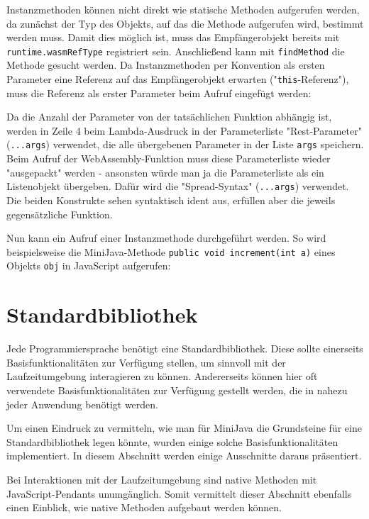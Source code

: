 Instanzmethoden können nicht direkt wie statische Methoden aufgerufen werden, da zunächst der Typ des Objekts, auf das die Methode aufgerufen wird, bestimmt werden muss. Damit dies möglich ist, muss das Empfängerobjekt bereits mit \lstinline{runtime.wasmRefType} registriert sein. Anschließend kann mit \lstinline{findMethod} die Methode gesucht werden. Da Instanzmethoden per Konvention als ersten Parameter eine Referenz auf das Empfängerobjekt erwarten ("\lstinline{this}-Referenz"), muss die Referenz als erster Parameter beim Aufruf eingefügt werden:



Da die Anzahl der Parameter von der tatsächlichen Funktion abhängig ist, werden in Zeile 4 beim Lambda-Ausdruck in der Parameterliste "Rest-Parameter" (\lstinline{...args}) \cite{MDNJavaScript} verwendet, die alle übergebenen Parameter in der Liste \lstinline{args} speichern. Beim Aufruf der WebAssembly-Funktion muss diese Parameterliste wieder "ausgepackt" werden - ansonsten würde man ja die Parameterliste als ein Listenobjekt übergeben. Dafür wird die "Spread-Syntax" (\lstinline{...args}) verwendet. Die beiden Konstrukte sehen syntaktisch ident aus, erfüllen aber die jeweils gegensätzliche Funktion.

Nun kann ein Aufruf einer Instanzmethode durchgeführt werden. So wird beispielsweise die MiniJava-Methode \lstinline{public void increment(int a)} eines Objekts \lstinline{obj} in JavaScript aufgerufen:



\section{Standardbibliothek}

Jede Programmiersprache benötigt eine Standardbibliothek. Diese sollte einerseits Basisfunktionalitäten zur Verfügung stellen, um sinnvoll mit der Laufzeitumgebung interagieren zu können. Andererseits können hier oft verwendete Basisfunktionalitäten zur Verfügung gestellt werden, die in nahezu jeder Anwendung benötigt werden.

Um einen Eindruck zu vermitteln, wie man für MiniJava die Grundsteine für eine Standardbibliothek legen könnte, wurden einige solche Basisfunktionalitäten implementiert. In diesem Abschnitt werden einige Ausschnitte daraus präsentiert.

Bei Interaktionen mit der Laufzeitumgebung sind native Methoden mit JavaScript-Pendants unumgänglich. Somit vermittelt dieser Abschnitt ebenfalls einen Einblick, wie native Methoden aufgebaut werden können.

